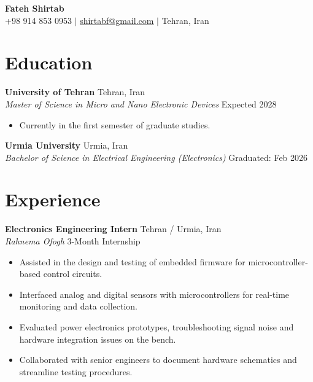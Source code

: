 \documentclass[letterpaper,10pt]{article}
\begin{document}
\begin{center}
    \textbf{\Huge Fateh Shirtab} \\ \vspace{4pt}
    \small +98 914 853 0953 $|$ 
    \href{mailto:shirtabf@gmail.com}{\underline{shirtabf@gmail.com}} $|$ 
    Tehran, Iran
\end{center}

\section{Education}
  \textbf{University of Tehran} \hfill Tehran, Iran \\
  \textit{Master of Science in Micro and Nano Electronic Devices} \hfill Expected 2028 \\
  \begin{itemize}[leftmargin=0.15in, label={--}]
      \item Currently in the first semester of graduate studies.
  \end{itemize}
  \vspace{2pt}
  \textbf{Urmia University} \hfill Urmia, Iran \\
  \textit{Bachelor of Science in Electrical Engineering (Electronics)} \hfill Graduated: Feb 2026 \\
  

\section{Experience}
  \textbf{Electronics Engineering Intern} \hfill Tehran / Urmia, Iran \\
  \textit{Rahnema Ofogh} \hfill 3-Month Internship \\
  \begin{itemize}[leftmargin=0.15in]
      \item Assisted in the design and testing of embedded firmware for microcontroller-based control circuits.
      \item Interfaced analog and digital sensors with microcontrollers for real-time monitoring and data collection.
      \item Evaluated power electronics prototypes, troubleshooting signal noise and hardware integration issues on the bench.
      \item Collaborated with senior engineers to document hardware schematics and streamline testing procedures.
  \end{itemize}
\end{document}
